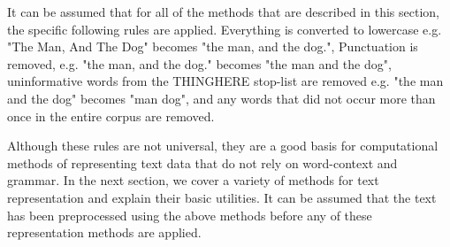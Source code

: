 


It can be assumed that for all of the methods that are described in this section, the specific following rules are applied. Everything is converted to lowercase e.g. "The Man, And The Dog" becomes  "the man, and the dog.", Punctuation is removed, e.g. "the man, and the dog." becomes "the man and the dog", uninformative words from the THINGHERE stop-list are removed e.g. "the man and the dog" becomes "man dog", and any words that did not occur more than once in the entire corpus are removed. %


Although these rules are not universal, they are a good basis for computational methods of representing text data that do not rely on word-context and grammar. In the next section, we cover a variety of methods for text representation and explain their basic utilities. It can be assumed that the text has been preprocessed using the above methods before any of these representation methods are applied.


